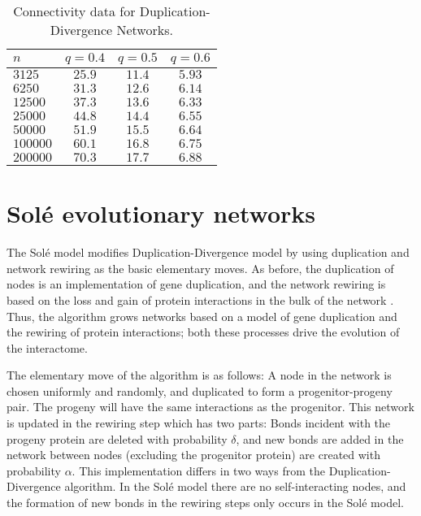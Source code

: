 \documentclass[12pt]{iopart}
\begin{document}
\begin{table}[t!]
\centering
\caption{Connectivity data for Duplication-Divergence Networks.}
      \begin{tabular}{lccc}
        \hline
       $n$    &  $q=0.4$  & $q=0.5$  & $q=0.6$ \\ \hline
        $3125$ & $25.9$ & $11.4$ & $5.93$ \\
        $6250$ & $31.3$ & $12.6$ & $6.14$ \\
      $12500$ & $37.3$ & $13.6$ & $6.33$ \\
      $25000$ & $44.8$ & $14.4$ & $6.55$ \\
      $50000$ & $51.9$ & $15.5$ & $6.64$ \\
    $100000$ & $60.1$ & $16.8$ & $6.75$ \\
    $200000$ & $70.3$ & $17.7$ & $6.88$ \\ \hline
      \end{tabular}
\label{table1}
\end{table}




\section{Sol\'e evolutionary networks}

The Sol\'e model \cite{SPSK02,PS03}
modifies  Duplication-Divergence model by using duplication and network 
rewiring as the basic elementary moves.  As before, the duplication of nodes is an implementation
of gene duplication, and the network rewiring is based on the loss and gain of protein 
interactions in the bulk of the network \cite{BAJ00}.   Thus, the algorithm grows
networks based on a model of gene duplication and the rewiring of 
protein interactions; both these processes drive the evolution of the interactome.

The elementary move of the algorithm is as follows:  A node in the network is chosen 
uniformly and randomly, and duplicated to form a progenitor-progeny pair.  The
progeny will have the same interactions as the progenitor.  This network is updated in the
rewiring step which has two parts:  Bonds incident with the progeny protein are deleted
with probability $\delta$, and new bonds are added in the network between nodes (excluding
the progenitor protein) are created with probability $\alpha$.  This implementation differs in
two ways from the Duplication-Divergence algorithm.  In the Sol\'e model there 
are no self-interacting nodes, and the formation of new bonds in the rewiring steps
only occurs in the Sol\'e model.
\end{document}
